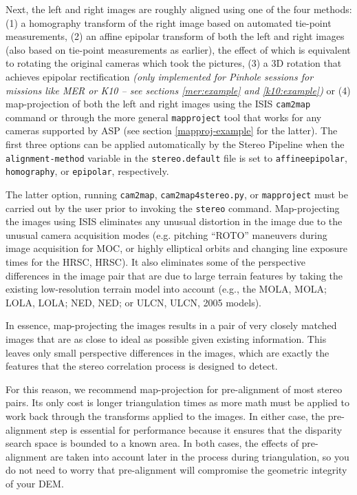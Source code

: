 Next, the left and right images are roughly aligned using one of the
four methods: (1) a homography transform of the right image based on
automated tie-point measurements, (2) an affine epipolar transform of
both the left and right images (also based on tie-point measurements as
earlier), the effect of which is equivalent to rotating the original
cameras which took the pictures, (3) a 3D rotation that achieves
epipolar rectification {\it(only implemented for Pinhole sessions for
missions like MER or K10 -- see sections \ref{mer:example} and
\ref{k10:example})} or (4) map-projection of both the left and right
images using the \ac{ISIS} \texttt{cam2map} command or through the more
general \texttt{mapproject} tool that works for any cameras supported by
ASP (see section \ref{mapproj-example} for the latter).  The first three
options can be applied automatically by the Stereo Pipeline when the
\texttt{alignment-method} variable in the \texttt{stereo.default} file
is set to \texttt{affineepipolar}, \texttt{homography}, or
\texttt{epipolar}, respectively.

The latter option, running {\tt cam2map}, {\tt cam2map4stereo.py}, or
{\tt mapproject} must be carried out by the user prior to
invoking the {\tt stereo} command.  Map-projecting the images using
\ac{ISIS} eliminates any unusual distortion in the image due to the
unusual camera acquisition modes (e.g. pitching ``ROTO'' maneuvers
during image acquisition for \ac{MOC}, or highly elliptical orbits and
changing line exposure times for the \acl{HRSC}, \acs{HRSC}).  It also
eliminates some of the perspective differences in the image pair that
are due to large terrain features by taking the existing low-resolution
terrain model into account (e.g., the \acl{MOLA}, \acs{MOLA};
\acl{LOLA}, \acs{LOLA}; \acl {NED}, \acs {NED}; or \acl{ULCN},
\acs{ULCN}, 2005 models).

In essence, map-projecting the images results in a pair of very
closely matched images that are as close to ideal as possible given
existing information. This leaves only small perspective differences
in the images, which are exactly the features that the stereo
correlation process is designed to detect.

For this reason, we recommend map-projection for pre-alignment of most
stereo pairs. Its only cost is longer triangulation times as more math
must be applied to work back through the transforms applied to the images. In
either case, the pre-alignment step is essential for performance
because it ensures that the disparity search space is bounded to a
known area.  In both cases, the effects of pre-alignment are taken
into account later in the process during triangulation, so you do not
need to worry that pre-alignment will compromise the geometric
integrity of your \ac{DEM}.

